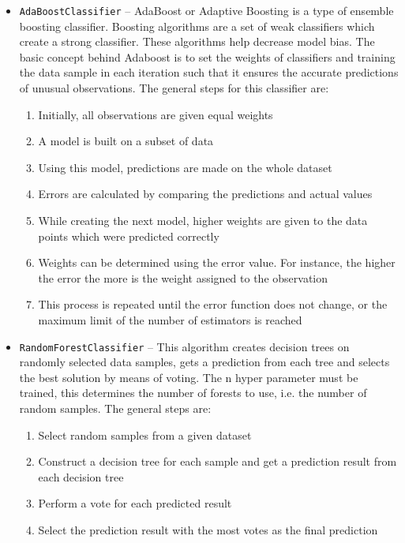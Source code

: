 \begin{itemize}
    \item \texttt{AdaBoostClassifier} -- AdaBoost or Adaptive Boosting is a type of ensemble boosting classifier. Boosting algorithms are a set of weak classifiers which create a strong classifier. These algorithms help decrease model bias. The basic concept behind Adaboost is to set the weights of classifiers and training the data sample in each iteration such that it ensures the accurate predictions of unusual observations. The general steps for this classifier are\cite{adaBoostClass}:
    \begin{enumerate}
        \item Initially, all observations are given equal weights
        \item A model is built on a subset of data
        \item Using this model, predictions are made on the whole dataset
        \item Errors are calculated by comparing the predictions and actual values
        \item While creating the next model, higher weights are given to the data points which were predicted correctly
        \item Weights can be determined using the error value. For instance, the higher the error the more is the weight assigned to the observation
        \item This process is repeated until the error function does not change, or the maximum limit of the number of estimators is reached
    \end{enumerate}
    \item \texttt{RandomForestClassifier} -- This algorithm creates decision trees on randomly selected data samples, gets a prediction from each tree and selects the best solution by means of voting. The n hyper parameter must be trained, this determines the number of forests to use, i.e. the number of random samples. The general steps are\cite{randomForestClass}:
    \begin{enumerate}
        \item Select random samples from a given dataset
        \item Construct a decision tree for each sample and get a prediction result from each decision tree
        \item Perform a vote for each predicted result
        \item Select the prediction result with the most votes as the final prediction
    \end{enumerate}

\end{itemize}
